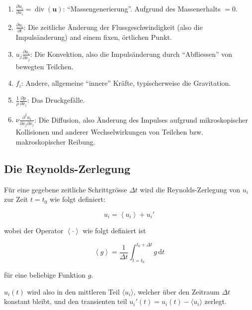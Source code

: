 \begin{enumerate}
    \item $\frac{\partial u_i}{\partial x_i} = \operatorname{div}(\mathbf{u})$: ``Massengenerierung''.
    Aufgrund des Massenerhalts $ = 0$.
    \item $\frac{\partial u_i}{\partial t}$: Die zeitliche Änderung der Flussgeschwindigkeit (also die 
        Impulsänderung) and einem fixen, örtlichen Punkt.
    \item $u_j \frac{\partial u_i}{\partial x_j}$: Die Konvektion, also die Impulsänderung durch ``Abfliessen''
        von bewegten Teilchen.
    \item $f_i$: Andere, allgemeine ``innere'' Kräfte, typischerweise die Gravitation.
    \item $\frac{1}{\rho} \frac{\partial p}{\partial x_i}$: Das Druckgefälle.
    \item $\nu \frac{\partial^2 u_i}{\partial x_j \partial x_j}$: Die Diffusion, also Änderung des Impulses
        aufgrund mikroskopischer Kollisionen und anderer Wechselwirkungen von Teilchen bzw.
        makroskopischer Reibung.
\end{enumerate}

\subsection{Die Reynolds-Zerlegung}

Für eine gegebene zeitliche Schrittgrösse $\Delta t$ wird die Reynolds-Zerlegung von $u_i$ zur Zeit $t = t_0$
wie folgt definiert:

\newcommand{\ravg}[1]{\left\langle #1 \right\rangle}
\newcommand{\rdecomp}[1]{\ravg{#1} + #1'}

\begin{equation}
    \label{reynolds:eqs:reynolds-decomp}
    u_i = \rdecomp{u_i}
\end{equation}

wobei der Operator $\ravg{\cdot}$ wie folgt definiert ist

\begin{equation}
    \ravg{g} = \frac{1}{\Delta t}\int_{t=t_0}^{t_0 + \Delta t} g \mathrm{\,d}t
\end{equation}

für eine beliebige Funktion $g$.

$u_i(t)$ wird also in den mittleren Teil $\langle u_i \rangle$, welcher über den Zeitraum
$\Delta t$ konstant bleibt, und den transienten teil $u_i'(t) = u_i(t) - \langle u_i \rangle$
zerlegt.

